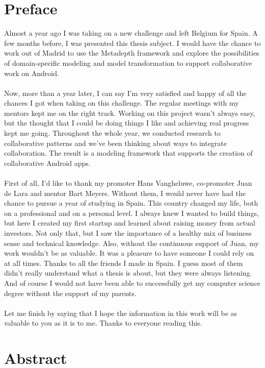 \chapter*{Preface}

Almost a year ago I was taking on a new challenge and left Belgium for Spain. A few months before, I was presented this thesis subject. I would have the chance to work out of Madrid to use the Metadepth framework and explore the possibilities of domain-specific modeling and model transformation to support collaborative work on Android. \\ \\
Now, more than a year later, I can say I'm very satisfied and happy of all the chances I got when taking on this challenge. The regular meetings with my mentors kept me on the right track. Working on this project wasn't always easy, but the thought that I could be doing things I like and achieving real progress kept me going. Throughout the whole year, we conducted research to collaborative patterns and we've been thinking about ways to integrate collaboration. The result is a modeling framework that supports the creation of collaborative Android apps.   \\ \\
First of all, I'd like to thank my promoter Hans Vangheluwe, co-promoter Juan de Lara and mentor Bart Meyers. Without them, I would never have had the chance to pursue a year of studying in Spain. This country changed my life, both on a professional and on a personal level. I always knew I wanted to build things, but here I created my first startup and learned about raising money from actual investors. Not only that, but I saw the importance of a healthy mix of business sense and technical knowledge. Also, without the continuous support of Juan, my work wouldn't be as valuable. It was a pleasure to have someone I could rely on at all times. Thanks to all the friends I made in Spain. I guess most of them didn't really understand what a thesis is about, but they were always listening. And of course I would not have been able to successfully get my computer science degree without the support of my parents. \\ \\ 
Let me finish by saying that I hope the information in this work will be as valuable to you as it is to me. Thanks to everyone reading this.

\chapter*{Abstract}

